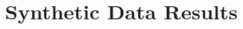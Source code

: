 \documentclass[aoas, preprint]{imsart}
\numberwithin{equation}{section}
\theoremstyle{plain}
\begin{document}

\section{Synthetic Data Results}
\label{syntheticData}
\end{document}
